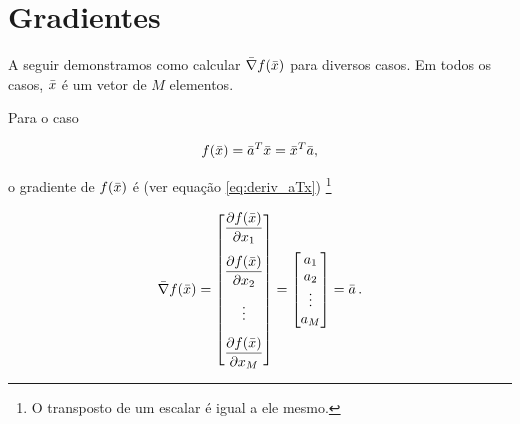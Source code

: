 \section{Gradientes}

A seguir demonstramos como calcular $\bar{\nabla}f(\bar{x})$
para diversos casos.
Em todos os casos, $\bar{x}$ é um vetor de $M$ elementos.

\begin{example}
    Para o caso

    \begin{equation}
    f(\bar{x}) = \bar{a}^T\bar{x} = \bar{x}^T\bar{a},
    \end{equation}
    
    \noindent o gradiente de $f(\bar{x})$ é (ver equação \ref{eq:deriv_aTx})
    \footnote{O transposto de um escalar é igual a ele mesmo.}
    
    \begin{equation}
    \vect{\nabla}f(\vect{x}) =
    \begin{bmatrix}
    \dfrac{\partial f(\vect{x})}{\partial x_1} \vspace{0.3cm}\\
    \dfrac{\partial f(\vect{x})}{\partial x_2} \vspace{0.3cm}\\
    \vdots \vspace{0.3cm}\\
    \dfrac{\partial f(\vect{x})}{\partial x_M}
    \end{bmatrix}
    =
    \begin{bmatrix}
    a_1 \\ a_2 \\ \vdots \\ a_M
    \end{bmatrix}
    = \vect{a}
    \thinspace .
    \end{equation}
\end{example}

